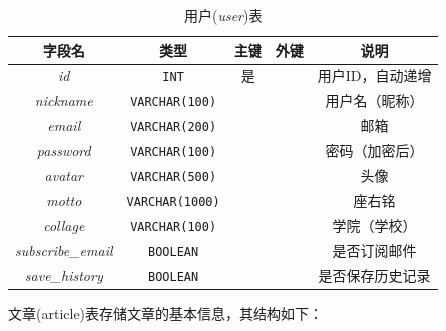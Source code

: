 \documentclass[UTF8,openany]{ctexbook}
\begin{document}
\begin{table}[H]
    \centering
    \begin{tabular}{|c|c|c|c|c|}
        \hline
        \textbf{字段名} & \textbf{类型} & \textbf{主键} & \textbf{外键} & \textbf{说明} \\
        \hline
        \textit{id} & \texttt{INT} & 是 &  & 用户ID，自动递增 \\
        \hline
        \textit{nickname} & \texttt{VARCHAR(100)} &  &  & 用户名（昵称） \\
        \hline
        \textit{email} & \texttt{VARCHAR(200)} &  &  & 邮箱 \\
        \hline
        \textit{password} & \texttt{VARCHAR(100)} &  &  & 密码（加密后） \\
        \hline
        \textit{avatar} & \texttt{VARCHAR(500)} &  &  & 头像 \\
        \hline
        \textit{motto} & \texttt{VARCHAR(1000)} &  &  & 座右铭 \\
        \hline
        \textit{collage} & \texttt{VARCHAR(100)} &  &  & 学院（学校） \\
        \hline
        \textit{subscribe\_email} & \texttt{BOOLEAN} &  &  & 是否订阅邮件 \\
        \hline
        \textit{save\_history} & \texttt{BOOLEAN} &  &  & 是否保存历史记录 \\
        \hline
    \end{tabular}
    \caption{用户(\textit{user})表}
\end{table}

文章(article)表存储文章的基本信息，其结构如下：
\end{document}
